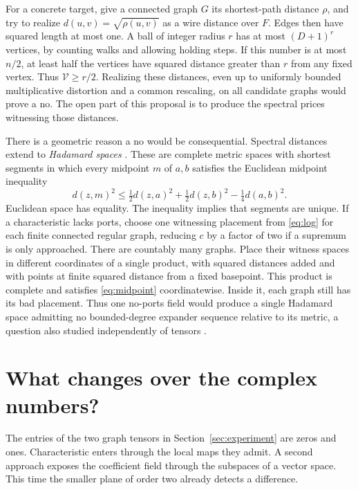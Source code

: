 \documentclass[11pt]{article}
\theoremstyle{definition}
\newcommand{\Var}{\mathcal V}
\begin{document}
For a concrete target, give a connected graph \(G\) its shortest-path
distance \(\rho\), and try to realize \(d(u,v)=\sqrt{\rho(u,v)}\) as a wire
distance over \(F\). Edges then have squared length at most one. A ball of
integer radius \(r\) has at most \((D+1)^r\) vertices, by counting walks
and allowing holding steps. If this number is at most \(n/2\), at least
half the vertices have squared distance greater than \(r\) from any
fixed vertex. Thus \(\Var\ge r/2\). Realizing these distances, even up to
uniformly bounded multiplicative distortion and a common rescaling, on
all candidate graphs would prove a no. The open part of this proposal
is to produce the spectral prices witnessing those distances.

There is a geometric reason a no would be consequential. Spectral
distances extend to \emph{Hadamard spaces} \cite{euclid}. These are
complete metric spaces with shortest segments in which every midpoint
\(m\) of \(a,b\) satisfies the Euclidean midpoint inequality
\begin{equation}
 d(z,m)^2\le\tfrac12d(z,a)^2+\tfrac12d(z,b)^2-\tfrac14d(a,b)^2.
 \label{eq:midpoint}
\end{equation}
Euclidean space has equality. The inequality implies that segments are
unique. If a characteristic lacks ports, choose one witnessing placement
from \eqref{eq:log} for each finite connected regular graph, reducing
\(c\) by a factor of two if a supremum is only approached. There are
countably many graphs. Place their witness spaces in different coordinates
of a single product, with squared distances added and with points at
finite squared distance from a fixed basepoint. This product is complete
and satisfies \eqref{eq:midpoint} coordinatewise. Inside it, each graph
still has its bad placement. Thus one no-ports field would produce a
single Hadamard space admitting no bounded-degree expander sequence
relative to its metric, a question also studied independently of tensors
\cite{mendel,ann}.

\section{What changes over the complex numbers?}
\label{sec:flags}

The entries of the two graph tensors in Section~\ref{sec:experiment} are
zeros and ones. Characteristic enters through the local maps they admit.
A second approach exposes the coefficient field through the subspaces
of a vector space. This time the smaller plane of order two already
detects a difference.
\end{document}
